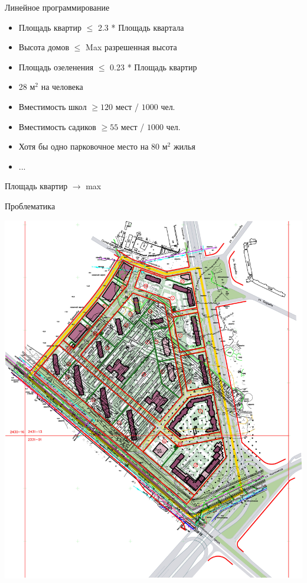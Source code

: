 \documentclass[14pt, fleqn, xcolor={dvipsnames, table}]{beamer}
\begin{document}
        \begin{frame}{Линейное программирование}
            \begin{itemize}
                \item Площадь квартир $\le$ 2.3 * Площадь квартала
                \item Высота домов $\le$ Max разрешенная высота
                \item Площадь озеленения $\le$ 0.23 * Площадь квартир
                \item 28 м$^2$ на человека
                \item Вместимость школ $\ge 120$ мест / $1000$ чел.
                \item Вместимость садиков $\ge 55$ мест / $1000$ чел.
                \item Хотя бы одно парковочное место на 80 м$^2$ жилья
                \item ...
            \end{itemize}
            Площадь квартир $\longrightarrow$ max            
                          
        \end{frame}
        
        \begin{frame}{Проблематика}
            \begin{center}
                \includegraphics[scale=0.075]{nerd.jpg} 
            \end{center}  
        \end{frame}
        
\end{document}
